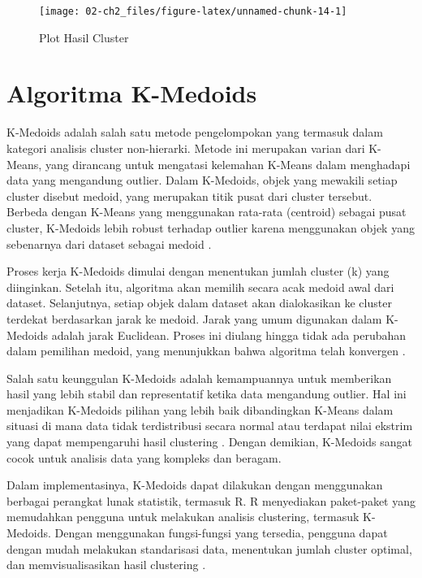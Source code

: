 \documentclass[
  oneside]{book}
\begin{document}
\begin{figure}[h]

{\centering \texttt{[image: 02-ch2\_files/figure-latex/unnamed-chunk-14-1]} 

}

\caption{Plot Hasil Cluster}\label{fig:unnamed-chunk-14}
\end{figure}

\chapter{Algoritma K-Medoids}\label{kmed}

K-Medoids adalah salah satu metode pengelompokan yang termasuk dalam kategori analisis cluster non-hierarki. Metode ini merupakan varian dari K-Means, yang dirancang untuk mengatasi kelemahan K-Means dalam menghadapi data yang mengandung outlier. Dalam K-Medoids, objek yang mewakili setiap cluster disebut medoid, yang merupakan titik pusat dari cluster tersebut. Berbeda dengan K-Means yang menggunakan rata-rata (centroid) sebagai pusat cluster, K-Medoids lebih robust terhadap outlier karena menggunakan objek yang sebenarnya dari dataset sebagai medoid \citep{jiawei2006data}.

Proses kerja K-Medoids dimulai dengan menentukan jumlah cluster (k) yang diinginkan. Setelah itu, algoritma akan memilih secara acak medoid awal dari dataset. Selanjutnya, setiap objek dalam dataset akan dialokasikan ke cluster terdekat berdasarkan jarak ke medoid. Jarak yang umum digunakan dalam K-Medoids adalah jarak Euclidean. Proses ini diulang hingga tidak ada perubahan dalam pemilihan medoid, yang menunjukkan bahwa algoritma telah konvergen \citep{setyawati2017analisis}.

Salah satu keunggulan K-Medoids adalah kemampuannya untuk memberikan hasil yang lebih stabil dan representatif ketika data mengandung outlier. Hal ini menjadikan K-Medoids pilihan yang lebih baik dibandingkan K-Means dalam situasi di mana data tidak terdistribusi secara normal atau terdapat nilai ekstrim yang dapat mempengaruhi hasil clustering \citep{vercellis2009sistem}. Dengan demikian, K-Medoids sangat cocok untuk analisis data yang kompleks dan beragam.

Dalam implementasinya, K-Medoids dapat dilakukan dengan menggunakan berbagai perangkat lunak statistik, termasuk R. R menyediakan paket-paket yang memudahkan pengguna untuk melakukan analisis clustering, termasuk K-Medoids. Dengan menggunakan fungsi-fungsi yang tersedia, pengguna dapat dengan mudah melakukan standarisasi data, menentukan jumlah cluster optimal, dan memvisualisasikan hasil clustering \citep{santoso2012aplikasi}.
\end{document}
